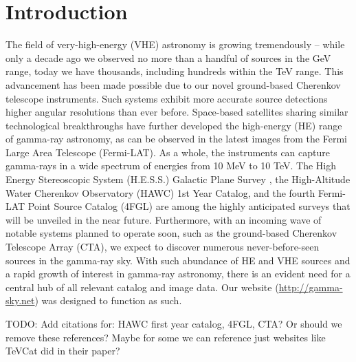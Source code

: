\section{Introduction}

%
%
%
%


    The field of very-high-energy (VHE) astronomy is growing tremendously – while only a decade ago we observed no more than a handful of sources in the GeV range, today we have thousands, including hundreds within the TeV range. This advancement has been made possible due to our novel ground-based Cherenkov telescope instruments. Such systems exhibit more accurate source detections higher angular resolutions than ever before. Space-based satellites sharing similar technological breakthroughs have further developed the high-energy (HE) range of gamma-ray astronomy, as can be observed in the latest images from the Fermi Large Area Telescope (Fermi-LAT). As a whole, the instruments can capture gamma-rays in a wide spectrum of energies from 10 MeV to 10 TeV. The High Energy Stereoscopic System (H.E.S.S.) Galactic Plane Survey \cite{hgps}, the High-Altitude Water Cherenkov Observatory (HAWC) 1st Year Catalog, and the fourth Fermi-LAT Point Source Catalog (4FGL) are among the highly anticipated surveys that will be unveiled in the near future. Furthermore, with an incoming wave of notable systems planned to operate soon, such as the ground-based Cherenkov Telescope Array (CTA), we expect to discover numerous never-before-seen sources in the gamma-ray sky. With such abundance of HE and VHE sources and a rapid growth of interest in gamma-ray astronomy, there is an evident need for a central hub of all relevant catalog and image data. Our website (\url{http://gamma-sky.net}) was designed to function as such.

    TODO: Add citations for: HAWC first year catalog, 4FGL, CTA? Or should we remove these references? Maybe for some we can reference just websites like TeVCat did in their paper?
